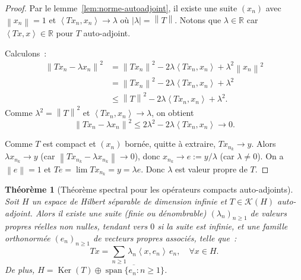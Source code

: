 \documentclass[a4paper,12pt]{book}
\DeclareMathOperator{\Ker}{Ker}
\DeclareMathOperator{\spn}{span}
\newcommand{\R}{\mathbb{R}}
\newcommand{\norm}[1]{\left\| #1 \right\|}
\newcommand{\abs}[1]{\left| #1 \right|}
\newcommand{\inner}[2]{\left\langle #1, #2 \right\rangle}
\theoremstyle{definition}
\theoremstyle{plain}
\newtheorem{theoreme}[definition]{Théorème}
\theoremstyle{remark}
\begin{document}
\begin{proof}
Par le lemme~\ref{lem:norme-autoadjoint}, il existe une suite $(x_n)$ avec
$\norm{x_n} = 1$ et $\inner{Tx_n}{x_n} \to \lambda$ où $\abs{\lambda} = \norm{T}$.
Notons que $\lambda \in \R$ car $\inner{Tx}{x} \in \R$ pour $T$ auto-adjoint.

Calculons~:
\begin{align*}
  \norm{Tx_n - \lambda x_n}^2
    &= \norm{Tx_n}^2 - 2\lambda\inner{Tx_n}{x_n} + \lambda^2\norm{x_n}^2 \\
    &= \norm{Tx_n}^2 - 2\lambda\inner{Tx_n}{x_n} + \lambda^2 \\
    &\le \norm{T}^2 - 2\lambda\inner{Tx_n}{x_n} + \lambda^2.
\end{align*}
Comme $\lambda^2 = \norm{T}^2$ et $\inner{Tx_n}{x_n} \to \lambda$, on obtient
\[
  \norm{Tx_n - \lambda x_n}^2 \le 2\lambda^2 - 2\lambda\inner{Tx_n}{x_n} \to 0.
\]

Comme $T$ est compact et $(x_n)$ bornée, quitte à extraire, $Tx_{n_k} \to y$. Alors
$\lambda x_{n_k} \to y$ (car $\norm{Tx_{n_k} - \lambda x_{n_k}} \to 0$), donc
$x_{n_k} \to e := y/\lambda$ (car $\lambda \neq 0$). On a $\norm{e} = 1$ et
$Te = \lim Tx_{n_k} = y = \lambda e$. Donc $\lambda$ est valeur propre de $T$.
\end{proof}

\begin{theoreme}[Théorème spectral pour les opérateurs compacts auto-adjoints]
\label{thm:spectral-compact}
Soit $H$ un espace de Hilbert séparable de dimension infinie et
$T \in \mathcal{K}(H)$ auto-adjoint. Alors il existe une suite (finie ou dénombrable)
$(\lambda_n)_{n \ge 1}$ de valeurs propres réelles non nulles, tendant vers $0$ si la
suite est infinie, et une famille orthonormée $(e_n)_{n \ge 1}$ de vecteurs propres
associés, telle que~:
\[
  Tx = \sum_{n \ge 1} \lambda_n \inner{x}{e_n}\, e_n, \quad \forall x \in H.
\]
De plus, $H = \Ker(T) \oplus \overline{\spn\{e_n : n \ge 1\}}$.
\end{theoreme}
\end{document}
